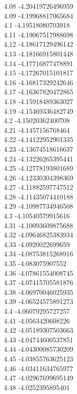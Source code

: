 {4.08	-4.20419726496959\\
4.09	-4.19968817065684\\
4.1	-4.19518080703918\\
4.11	-4.19067517988698\\
4.12	-4.18617129496142\\
4.13	-4.18166915801448\\
4.14	-4.17716877478891\\
4.15	-4.17267015101817\\
4.16	-4.16817329242646\\
4.17	-4.16367820472865\\
4.18	-4.15918489363027\\
4.19	-4.15469336482749\\
4.2	-4.15020362400708\\
4.21	-4.1457156768464\\
4.22	-4.14122952901335\\
4.23	-4.13674518616637\\
4.24	-4.13226265395441\\
4.25	-4.12778193801689\\
4.26	-4.12330304398369\\
4.27	-4.11882597747512\\
4.28	-4.11435074410188\\
4.29	-4.10987734946508\\
4.3	-4.10540579915616\\
4.31	-4.10093609875688\\
4.32	-4.09646825383934\\
4.33	-4.0920022699659\\
4.34	-4.08753815268916\\
4.35	-4.083075907552\\
4.36	-4.07861554008745\\
4.37	-4.07415705581876\\
4.38	-4.06970046025935\\
4.39	-4.06524575891273\\
4.4	-4.06079295727257\\
4.41	-4.0563420608226\\
4.42	-4.05189307503663\\
4.43	-4.04744600537851\\
4.44	-4.04300085730209\\
4.45	-4.03855763625123\\
4.46	-4.03411634765977\\
4.47	-4.02967699695149\\
4.48	-4.0252395895401\\
}
